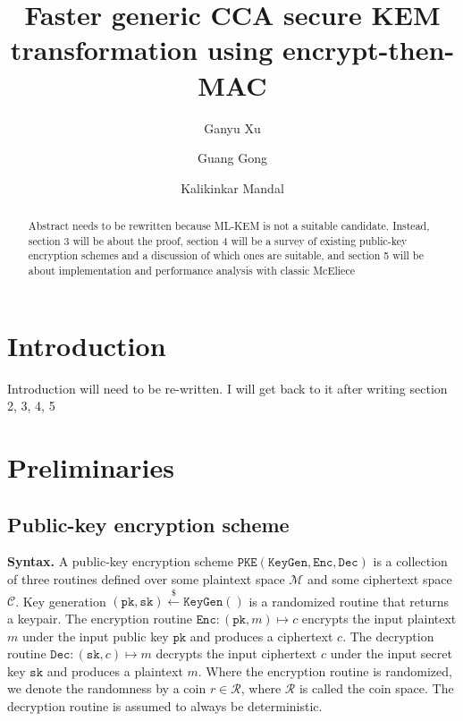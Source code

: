 \documentclass[runningheads]{llncs}
\newcommand{\pke}{\texttt{PKE}}
\newcommand{\keygen}{\texttt{KeyGen}}
\newcommand{\encrypt}{\texttt{Enc}}
\newcommand{\decrypt}{\texttt{Dec}}
\newcommand{\pk}{\texttt{pk}}
\newcommand{\sk}{\texttt{sk}}
\newcommand{\leftsample}{\stackrel{\$}{\leftarrow}}
\begin{document}
%
\title{Faster generic CCA secure KEM transformation using encrypt-then-MAC}
%
%

\author{
    Ganyu Xu \and
    Guang Gong \and
    Kalikinkar Mandal
}
%


\maketitle              %
%
\begin{abstract}
    Abstract needs to be rewritten because ML-KEM is not a suitable candidate. Instead, section 3 will be about the proof, section 4 will be a survey of existing public-key encryption schemes and a discussion of which ones are suitable, and section 5 will be about implementation and performance analysis with classic McEliece

\end{abstract}

\section{Introduction}\label{sec:introduction}
Introduction will need to be re-written. I will get back to it after writing section 2, 3, 4, 5

\section{Preliminaries}\label{sec:preliminaries}

\subsection{Public-key encryption scheme}
\textbf{Syntax.} A public-key encryption scheme $\pke(\keygen, \encrypt, \decrypt)$ is a collection of three routines defined over some plaintext space $\mathcal{M}$ and some ciphertext space $\mathcal{C}$. Key generation $(\pk, \sk) \leftsample \keygen()$ is a randomized routine that returns a keypair. The encryption routine $\encrypt: (\pk, m) \mapsto c$ encrypts the input plaintext $m$ under the input public key $\pk$ and produces a ciphertext $c$. The decryption routine $\decrypt: (\sk, c) \mapsto m$ decrypts the input ciphertext $c$ under the input secret key $\sk$ and produces a plaintext $m$. Where the encryption routine is randomized, we denote the randomness by a coin $r \in \mathcal{R}$, where $\mathcal{R}$ is called the coin space. The decryption routine is assumed to always be deterministic.
\end{document}
